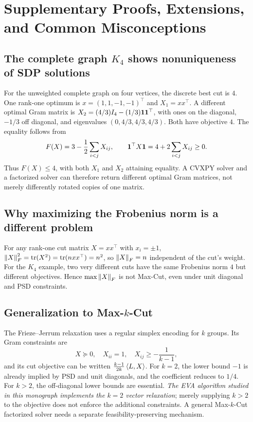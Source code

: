 \chapter{Supplementary Proofs, Extensions, and Common Misconceptions}\label{app:proofs}
\section{The complete graph $K_4$ shows nonuniqueness of SDP solutions}
For the unweighted complete graph on four vertices, the discrete best cut is $4$. One rank-one optimum is $x=(1,1,-1,-1)^\top$ and $X_1=xx^\top$. A different optimal Gram matrix is $X_2=(4/3)I_4-(1/3)\boldsymbol{1}\boldsymbol{1}^\top$, with ones on the diagonal, $-1/3$ off diagonal, and eigenvalues $(0,4/3,4/3,4/3)$. Both have objective $4$. The equality follows from
\[
F(X)=3-\frac12\sum_{i<j}X_{ij},\qquad \boldsymbol{1}^\top X\boldsymbol{1}=4+2\sum_{i<j}X_{ij}\ge0.
\]
Thus $F(X)\le4$, with both $X_1$ and $X_2$ attaining equality. A CVXPY solver and a factorized solver can therefore return different optimal Gram matrices, not merely differently rotated copies of one matrix.

\section{Why maximizing the Frobenius norm is a different problem}
For any rank-one cut matrix $X=xx^\top$ with $x_i=\pm1$, $\left\lVert X\right\rVert_F^2=\operatorname{tr}(X^2)=\operatorname{tr}(nxx^\top)=n^2$, so $\left\lVert X\right\rVert_F=n$ independent of the cut's weight. For the $K_4$ example, two very different cuts have the same Frobenius norm $4$ but different objectives. Hence $\max\left\lVert X\right\rVert_F$ is not Max-Cut, even under unit diagonal and PSD constraints.

\section{Generalization to Max-$k$-Cut}
The Frieze--Jerrum relaxation uses a regular simplex encoding for $k$ groups. Its Gram constraints are
\[
X\succeq0,\quad X_{ii}=1,\quad X_{ij}\ge-\frac1{k-1},
\]
and its cut objective can be written $\frac{k-1}{2k}\left\langle L,X\right\rangle$. For $k=2$, the lower bound $-1$ is already implied by PSD and unit diagonals, and the coefficient reduces to $1/4$. For $k>2$, the off-diagonal lower bounds are essential. \emph{The EVA algorithm studied in this monograph implements the $k=2$ vector relaxation}; merely supplying $k>2$ to the objective does not enforce the additional constraints. A general Max-$k$-Cut factorized solver needs a separate feasibility-preserving mechanism.

